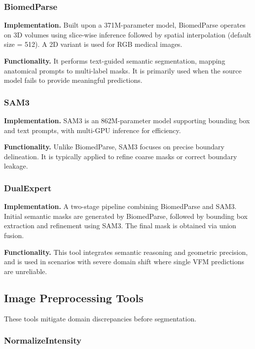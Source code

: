 \documentclass[sigconf]{acmart}
\begin{document}
\subsubsection{BiomedParse}

\textbf{Implementation.}
Built upon a 371M-parameter model, BiomedParse operates on 3D volumes using 
slice-wise inference followed by spatial interpolation (default size = 512). 
A 2D variant is used for RGB medical images.

\textbf{Functionality.}
It performs text-guided semantic segmentation, mapping anatomical prompts 
to multi-label masks. It is primarily used when 
the source model fails to provide meaningful predictions.

\subsubsection{SAM3}

\textbf{Implementation.}
SAM3 is an 862M-parameter model supporting bounding box and text prompts, 
with multi-GPU inference for efficiency.

\textbf{Functionality.}
Unlike BiomedParse, SAM3 focuses on precise boundary delineation. It is typically 
applied to refine coarse masks or correct boundary leakage.

\subsubsection{DualExpert}

\textbf{Implementation.}
A two-stage pipeline combining BiomedParse and SAM3. Initial semantic masks 
are generated by BiomedParse, followed by bounding box extraction and refinement 
using SAM3. The final mask is obtained via union fusion.

\textbf{Functionality.}
This tool integrates semantic reasoning and geometric precision, and is used 
in scenarios with severe domain shift where single VFM predictions are unreliable.

\subsection{Image Preprocessing Tools}

These tools mitigate domain discrepancies before segmentation.

\subsubsection{NormalizeIntensity}
\end{document}
